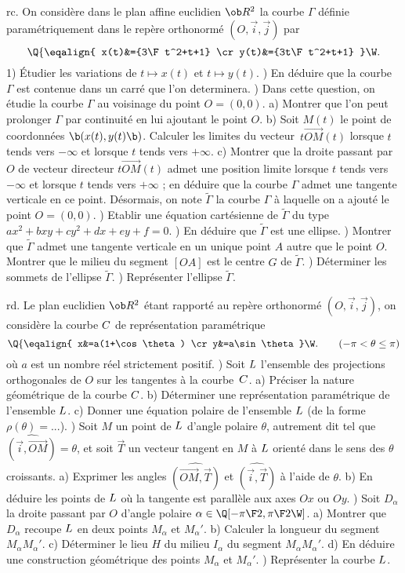 \exo [Level=1,Fight=3,Learn=3,Field=\Coniques,Type=\Problèmes,Origin=] rc. 
On considère dans le plan affine euclidien $\ob R^2$ la courbe $\Gamma$ définie paramétriquement dans le repère orthonormé $(O,\vec i,\vec j)$ par 
$$
\Q\{\eqalign{
x(t)&={3\F t^2+t+1}
\cr
y(t)&={3t\F t^2+t+1}
}\W.
$$ 
1) Étudier les variations de $t\mapsto x(t)$ et $t\mapsto y(t)$. ) En déduire que la courbe $\Gamma$ est contenue dans un carré que l'on determinera. ) Dans cette question, on étudie la courbe $\Gamma$ au voisinage du point $O=(0,0)$. \pn
a) Montrer que l'on peut prolonger $\Gamma$ par continuité en lui ajoutant le point $O$. \pn
b) Soit $M(t)$ le point de coordonnées $\b(x(t),y(t)\b)$. Calculer les limites du vecteur~$t\vec{OM}(t)$ lorsque $t$ tends vers $-\infty$ et lorsque $t$ tends vers $+\infty$. \pn
c) Montrer que la droite passant par $O$ de vecteur directeur $t\vec{OM}(t)$ admet une position limite lorsque  $t$ tends vers $-\infty$ et lorsque $t$ tends vers $+\infty$ ; en déduire que la courbe $\Gamma$ admet une tangente verticale en ce point. \pn
Désormais, on note $\tilde \Gamma$ la courbe $\Gamma$ à laquelle on a ajouté le point $O=(0,0)$. ) Etablir une équation cartésienne de $\tilde \Gamma$ du type $ax^2+bxy+cy^2+dx+ey+f=0$. ) En déduire que $\tilde \Gamma$ est une ellipse. ) Montrer que $\tilde \Gamma$ admet une tangente verticale en un unique point $A$ autre que le point $O$. 
Montrer que le milieu du segment $[OA]$ est le centre $G$ de $\tilde \Gamma$. ) Déterminer les sommets de l'ellipse $\tilde\Gamma$. ) Représenter l'ellipse $\tilde \Gamma$. 

\exo  [Level=1,Fight=3,Learn=3,Field=\CourbesParamétréesCartésiennes,Type=\Problèmes,Origin=] rd. 
Le plan euclidien $\ob R^2$ étant rapporté au repère orthonormé $(O,\vec i,\vec j)$, on considère la courbe $\sc C$ de représentation paramétrique 
$$
\Q\{\eqalign{
x&=a(1+\cos\theta)
\cr
y&=a\sin\theta
}\W.\qquad(-\pi<\theta\le\pi)
$$ 
où $a$ est un nombre réel strictement positif. ) Soit $\sc L$ l'ensemble des projections orthogonales de $O$ sur les tangentes à la courbe~$\sc C$. \pn
a) Préciser la nature géométrique de la courbe $\sc C$. \pn
b) Déterminer une représentation paramétrique de l'ensemble $\sc L$. \pn
c) Donner une équation polaire de l'ensemble $\sc L$ (de la forme $\rho(\theta)=...$). ) Soit $M$ un point de $\sc L$ d'angle polaire $\theta$, autrement dit tel que $\widehat{(\vec i,\vec{OM})}=\theta$,  et soit $\vec T$ un vecteur tangent en $M$ à $\sc L$ orienté dans le sens des $\theta$ croissants. \pn
a) Exprimer les angles $\widehat{(\vec{OM},\vec T)}$ et $\widehat{(\vec i,\vec T)}$ à l'aide de $\theta$. \pn
b) En déduire les points de $\sc L$ où la tangente est parallèle aux axes $Ox$ ou $Oy$. ) Soit $D_\alpha$ la droite passant par $O$ d'angle polaire $\alpha\in\Q[-{\pi\F2},{\pi\F2}\W]$. \pn
a) Montrer que $D_\alpha$ recoupe $\sc L$ en deux points $M_\alpha$ et $M_\alpha'$. \pn
b) Calculer la longueur du segment $M_\alpha M_\alpha'$. \pn
c) Déterminer le lieu $H$ du milieu $I_\alpha$ du segment $M_\alpha M_\alpha'$. \pn
d) En déduire une construction géométrique des points $M_\alpha$ et $M_\alpha'$. ) Représenter la courbe $\sc L$. 

